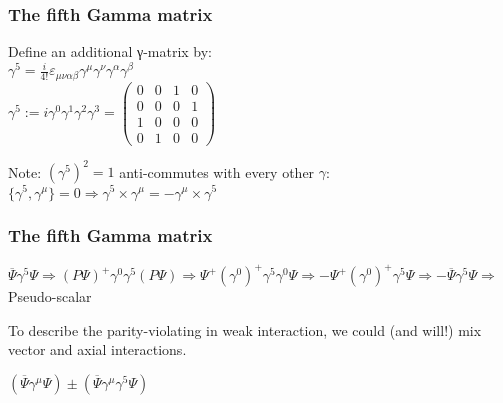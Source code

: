 \label{The fifth Gamma matrix}
\begin{frame}\frametitle{The fifth Gamma matrix}

Define an additional γ-matrix by:\\
$\gamma ^{5}={\frac {i}{4!}}\varepsilon _{\mu \nu \alpha \beta }\gamma ^{\mu }\gamma ^{\nu }\gamma ^{\alpha }\gamma ^{\beta }$
\\

${\displaystyle \gamma ^{5}:=i\gamma ^{0}\gamma ^{1}\gamma ^{2}\gamma ^{3}={\begin{pmatrix}0&0&1&0\\0&0&0&1\\1&0&0&0\\0&1&0&0\end{pmatrix}}}$



Note:
$(\gamma^5)^2 = 1$
anti-commutes with every other $\gamma$:
$\{\gamma^5,\gamma^\mu\}=0 \Longrightarrow \gamma^5\times \gamma^\mu = - \gamma^\mu \times \gamma^5 $


\end{frame}



\label{The fifth Gamma matrix}

\begin{frame}\frametitle{The fifth Gamma matrix}



$\overline{\Psi} \gamma^5 \Psi \Longrightarrow (P\Psi)^{+} \gamma^0 \gamma^5  (P\Psi)  \Longrightarrow \Psi^{+} (\gamma^0 )^{+} \gamma^5 \gamma^0 \Psi \Longrightarrow - \Psi^{+}  (\gamma^0 )^{+}  \gamma^5  \Psi \Longrightarrow  - \overline{\Psi} \gamma^5 \Psi \Longrightarrow $ Pseudo-scalar 
 



To describe the parity-violating in weak interaction, we could (and will!) mix vector and axial interactions.

$(\overline{\Psi}  \gamma^\mu \Psi) \pm (\overline{\Psi}  \gamma^\mu \gamma^5 \Psi)$




\end{frame}
